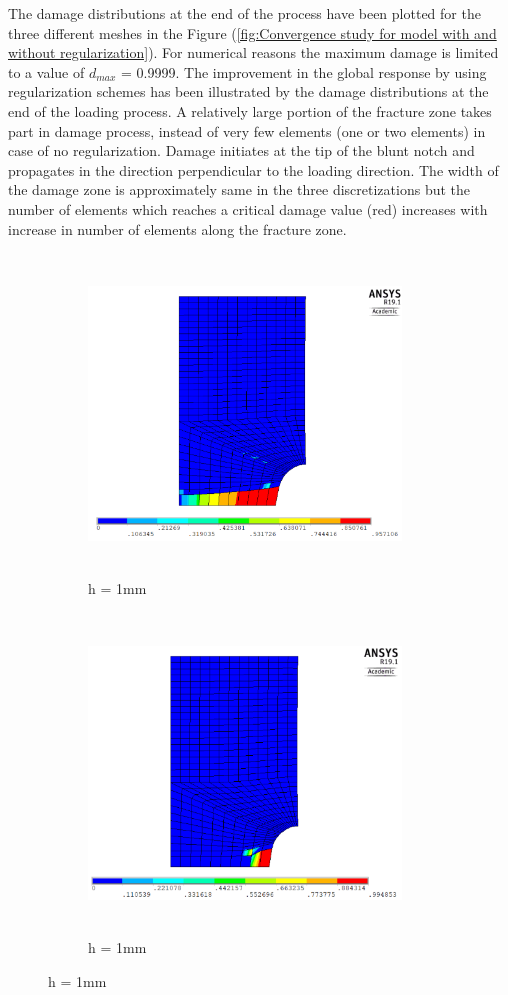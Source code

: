 \documentclass[a4paper,12pt,twoside]{report}
\begin{document}
\indent\indent\indent The damage distributions at the end of the process have been plotted for the three different meshes in the Figure (\ref{fig:Convergence study for model with and without regularization}). For numerical reasons the maximum damage is limited to a value of $d_{max}$ = 0.9999. The improvement in the global response by using regularization schemes has been illustrated by the damage distributions at the end of the loading process. A relatively large portion of the fracture zone takes part in damage process, instead of very few elements (one or two elements) in case of no regularization. Damage initiates at the tip of the blunt notch and propagates in the direction perpendicular to the loading direction. The width of the damage zone is approximately same in the three discretizations but the number of elements which reaches a critical damage value (red) increases with increase in number of elements along the fracture zone.
\begin{figure}[htbp!]
       \captionsetup[subfigure]{justification=centering}
     \begin{subfigure}{0.4\textwidth}
         \includegraphics[width=8.3cm,height=8.5cm,keepaspectratio]{25.d1-1-r.png}
         \caption{h = 1mm}
         \label{fig:d1-1-r}
     \end{subfigure}
    \hspace{1.8cm}
     \captionsetup[subfigure]{justification=centering}
     \begin{subfigure}{0.4\textwidth}
         \includegraphics[width=8.3cm,height=8.5cm,keepaspectratio]{25.d1-1-nr.png}
         \caption{h = 1mm}
         \label{fig:d1-1-nr}
     \end{subfigure}
\end{figure}
\end{document}
